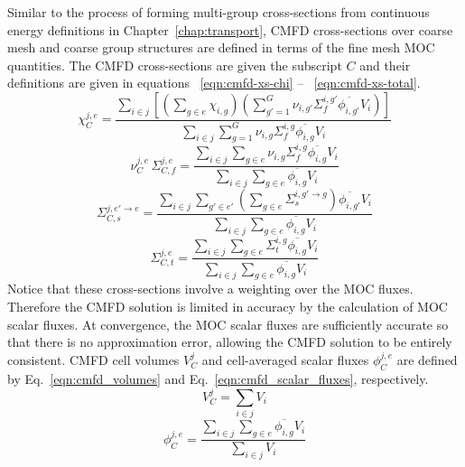Similar to the process of forming multi-group cross-sections from continuous energy definitions in Chapter~\ref{chap:transport}, CMFD cross-sections over coarse mesh and coarse group structures are defined in terms of the fine mesh MOC quantities. The CMFD cross-sections are given the subscript $C$ and their definitions are given in equations ~\ref{eqn:cmfd-xs-chi} -- ~\ref{eqn:cmfd-xs-total}. 
\begin{equation}
	\chi_C^{j,e} = \frac{\sum_{i \in j} \left[ \left(\sum_{g \in e} \chi_{i,g} \right) \left(\sum_{g'=1}^{G} \nu_{i, g'} \Sigma_f^{i,g'} \overline{\phi_{i,g'}} V_i \right)\right]}{\sum_{i \in j} \sum_{g=1}^{G} \nu_{i, g} \Sigma_f^{i,g} \overline{\phi_{i,g}} V_i}
	\label{eqn:cmfd-xs-chi}
\end{equation}
\begin{equation}
	\nu_C^{j,e} \, \Sigma_{C,f}^{j,e} = \frac{\sum_{i \in j} \sum_{g \in e} \nu_{i, g} \Sigma_f^{i,g} \overline{\phi_{i,g}} V_i}{\sum_{i \in j} \sum_{g \in e} \overline{\phi_{i,g}} V_i}
\end{equation}
\begin{equation}
	\Sigma_{C,s}^{j, e' \rightarrow e} = \frac{\sum_{i \in j} \sum_{g'\in e'} \left(\sum_{g \in e} \Sigma_{s}^{i, g' \rightarrow g} \right) \overline{\phi_{i,g'}} V_i}{\sum_{i \in j} \sum_{g\in e} \overline{\phi_{i,g}} V_i}
\end{equation}
\begin{equation}
	\Sigma_{C,t}^{j, e} = \frac{\sum_{i \in j} \sum_{g \in e} \Sigma_{t}^{i, g} \overline{\phi_{i,g}} V_i}{\sum_{i \in j} \sum_{g\in e} \overline{\phi_{i,g}} V_i}
	\label{eqn:cmfd-xs-total}
\end{equation}
Notice that these cross-sections involve a weighting over the MOC fluxes. Therefore the CMFD solution is limited in accuracy by the calculation of MOC scalar fluxes. At convergence, the MOC scalar fluxes are sufficiently accurate so that there is no approximation error, allowing the CMFD solution to be entirely consistent. CMFD cell volumes $V_C^j$ and cell-averaged scalar fluxes $\phi_C^{j,e}$ are defined by Eq.~\ref{eqn:cmfd_volumes} and Eq.~\ref{eqn:cmfd_scalar_fluxes}, respectively.
\begin{equation}
	V_C^j = \sum_{i \in j} V_i
	\label{eqn:cmfd_volumes}
\end{equation}
\begin{equation}
\phi_C^{j,e} = \frac{\sum_{i \in j} \sum_{g \in e} \overline{\phi_{i,g}} V_i}{\sum_{i \in j} V_i}
\label{eqn:cmfd_scalar_fluxes}
\end{equation}
